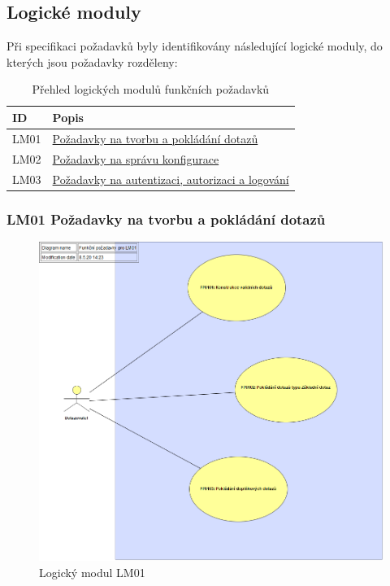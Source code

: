 \documentclass[thesis=M,czech]{FITthesis}[2019/12/23]
\begin{document}
\subsection{Logické moduly}
Při specifikaci požadavků byly identifikovány následující logické moduly, do kterých jsou požadavky rozděleny:

\begin{table}[H]
	\centering
	\begin{tabular}{|p{}|p{}|}
		\hline
  		{\textbf{ID}} & {\textbf{Popis}} \\
  		\hline \hline
  		LM01 & \hyperref[LM01]{Požadavky na tvorbu a pokládání dotazů} \\ \hline
		LM02 & \hyperref[LM02]{Požadavky na správu konfigurace} \\ \hline
		LM03 & \hyperref[LM03]{Požadavky na autentizaci, autorizaci a logování} \\ \hline
	\end{tabular}
 	\caption{Přehled logických modulů funkčních požadavků}
\label{tab:Přehled logických modulů funkčních požadavků}
\end{table}

\newpage
\subsubsection{LM01 Požadavky na tvorbu a pokládání dotazů}
\label{LM01}
\begin{figure}[H]
  \centering
  \includegraphics[width=\textwidth]{res/design/Funkční požadavky pro LM01.png}
  \caption{Logický modul LM01}
  \label{fig:Logický modul LM01}
\end{figure}
\end{document}
